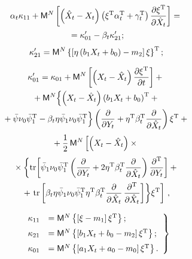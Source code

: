 \begin{multicols}{2}
    
    \vspace*{-9pt}
    
    \noindent
    \begin{multline}
\alpha_t\kappa_{11} + {\sf M}^N \left[ \left(\hat X_t-X_t\right)\left(\xi^{\mathrm{T}} 
\alpha_t^{\mathrm{T}} +\gamma_t^{\mathrm{T}}\right)
    \displaystyle\frac{\displaystyle \partial \xi^{\mathrm{T}}\mathstrut}{\displaystyle \partial \hat X_t\mathstrut}\right]={}\\
    {}=
    \kappa_{01}'-\beta_t\kappa_{21}';\label{e4.7-s2}
    \end{multline}
    \begin{equation}
    \kappa_{21}' = {\sf M}^N \left\{\left[ \eta\left(b_1X_t+b_0\right)-m_2\right] 
    \xi\right\}^{\mathrm{T}};\label{e4.8-s2}
    \end{equation}
    
    \vspace*{-9pt}
    
    \noindent
    \begin{multline}
\kappa_{01}' =\kappa_{01} + {\sf M}^N \left[ \left(X_t-\hat X_t\right)  
\displaystyle\frac{\displaystyle \partial \xi^{\mathrm{T}}\mathstrut}{\displaystyle \partial t\mathstrut} \right]+{}\\
{}+
     {\sf M}^N \Bigl\{ \left(X_t-\hat X_t\right) \left(b_1 X_t+b_0\right)^{\mathrm{T}} +{}\\
     {}+
    \bar \psi\nu_0\bar \psi_1^{\mathrm{T}} - \beta_t\eta\bar \psi_1\nu_0\bar 
    \psi_1^{\mathrm{T}}\Bigr\} \left(
    \displaystyle\frac{\displaystyle \partial\mathstrut}{\displaystyle \partial Y_t\mathstrut}+\eta^{\mathrm{T}}\beta_t^{\mathrm{T}} 
    \displaystyle\frac{\displaystyle \partial\mathstrut}{\displaystyle \partial \hat X_t\mathstrut}\right)\xi^{\mathrm{T}}+{}\\
{}+\displaystyle\frac{\displaystyle 1\mathstrut}{\displaystyle 2\mathstrut}\, {\sf M}^N\left[ \left(X_t-\hat X_t\right)\times{}\right.\\
{}\times \biggl\{ \mathrm{tr} 
\biggl[ \bar \psi_1\nu_0\bar \psi_1^{\mathrm{T}}
    \left( \displaystyle\frac{\displaystyle \partial\mathstrut}{\displaystyle \partial Y_t\mathstrut}+2 \eta^{\mathrm{T}}\beta_t^{\mathrm{T}} 
    \displaystyle\frac{\displaystyle \partial\mathstrut}{\displaystyle \partial \hat X_t\mathstrut}\right)
    \displaystyle\frac{\displaystyle \partial^{\mathrm{T}}\mathstrut}{\displaystyle \partial Y_t\mathstrut}\biggr]+{}\\
{}+\left.\mathrm{tr}\left[ \beta_t\eta\bar \psi_1\nu_0\bar \psi_1^{\mathrm{T}}
\eta^{\mathrm{T}}\beta_t^{\mathrm{T}} \displaystyle\frac{\displaystyle \partial \mathstrut}{\displaystyle \partial \hat X_t\mathstrut}
\,\displaystyle\frac{\displaystyle \partial^{\mathrm{T}}\mathstrut}{\displaystyle \partial \hat X_t\mathstrut}\right]\biggr\} 
\xi^{\mathrm{T}}\right] \,,\label{e4.9-s2}
\end{multline}

\vspace*{-8pt}

\begin{equation}
\left.
\begin{array}{rl}
\kappa_{11} &= {\sf M}^N \left\{ \left[ \xi - m_1\right] \xi^{\mathrm{T}}\right\};\\[6pt]
    \kappa_{21} &= {\sf M}^N \left\{\left[ b_1 X_t + b_0  - m_2\right] \xi^{\mathrm{T}} \right\};\\[6pt]
\kappa_{01} &= {\sf M}^N\left\{ \left[ a_1 X_t + a_0  - m_0\right] \xi^{\mathrm{T}} \right\}.
\end{array}
\right\}
\label{e4.10-s2}
\end{equation}


\end{multicols}
